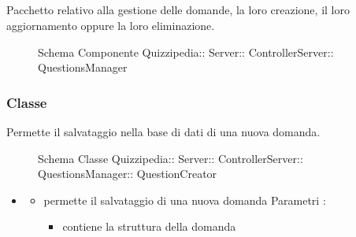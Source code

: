 \subsection{}
Pacchetto relativo alla gestione delle domande, la loro creazione, il loro aggiornamento oppure la loro eliminazione.
\begin{figure}[H]
\centering
\noindent{}
\caption[Schema Componente QuestionsManager]{Schema Componente Quizzipedia:: Server:: ControllerServer:: QuestionsManager}
\end{figure}
\subsubsection{Classe }
Permette il salvataggio nella base di dati di una nuova domanda.
\begin{figure}[H]
\centering
\noindent{}
\caption[Schema Classe QuestionCreator]{Schema Classe Quizzipedia:: Server:: ControllerServer:: QuestionsManager:: QuestionCreator}
\end{figure}
\begin{itemize}
\item {}
\begin{itemize}
\item {}
\newline
permette il salvataggio di una nuova domanda
\newline
Parametri :
\begin{itemize}
\item {}
\newline
contiene la struttura della domanda
\end{itemize}
\end{itemize}
\end{itemize}
